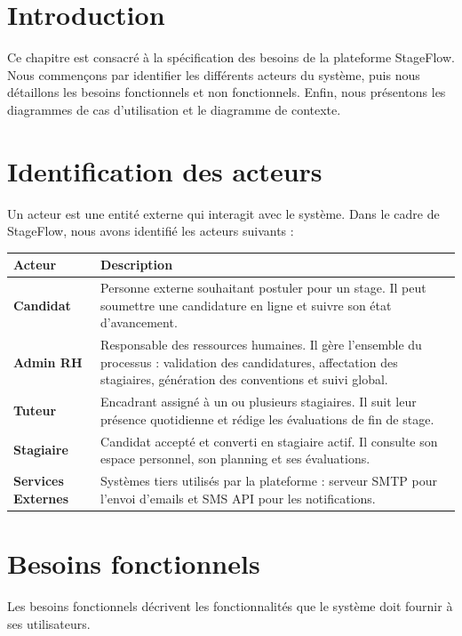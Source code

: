
\section{Introduction}
Ce chapitre est consacré à la spécification des besoins de la plateforme StageFlow. Nous commençons par identifier les différents acteurs du système, puis nous détaillons les besoins fonctionnels et non fonctionnels. Enfin, nous présentons les diagrammes de cas d'utilisation et le diagramme de contexte.

\section{Identification des acteurs}
Un acteur est une entité externe qui interagit avec le système. Dans le cadre de StageFlow, nous avons identifié les acteurs suivants :

\begin{center}
\begin{tabular}{|l|p{10cm}|}
\hline
\textbf{Acteur} & \textbf{Description} \\ \hline
\textbf{Candidat} & Personne externe souhaitant postuler pour un stage. Il peut soumettre une candidature en ligne et suivre son état d'avancement. \\ \hline
\textbf{Admin RH} & Responsable des ressources humaines. Il gère l'ensemble du processus : validation des candidatures, affectation des stagiaires, génération des conventions et suivi global. \\ \hline
\textbf{Tuteur} & Encadrant assigné à un ou plusieurs stagiaires. Il suit leur présence quotidienne et rédige les évaluations de fin de stage. \\ \hline
\textbf{Stagiaire} & Candidat accepté et converti en stagiaire actif. Il consulte son espace personnel, son planning et ses évaluations. \\ \hline
\textbf{Services Externes} & Systèmes tiers utilisés par la plateforme : serveur SMTP pour l'envoi d'emails et SMS API pour les notifications. \\ \hline
\end{tabular}
\end{center}

\section{Besoins fonctionnels}
Les besoins fonctionnels décrivent les fonctionnalités que le système doit fournir à ses utilisateurs.

